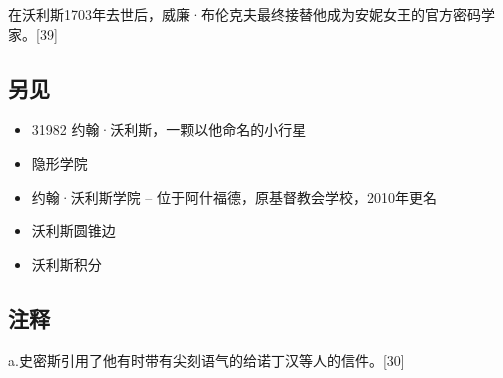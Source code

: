 在沃利斯1703年去世后，威廉·布伦克夫最终接替他成为安妮女王的官方密码学家。[39]
\subsection{另见}
\begin{itemize}
\item 31982 约翰·沃利斯，一颗以他命名的小行星
\item 隐形学院
\item 约翰·沃利斯学院 – 位于阿什福德，原基督教会学校，2010年更名
\item 沃利斯圆锥边
\item 沃利斯积分
\end{itemize}
\subsection{注释}
a.史密斯引用了他有时带有尖刻语气的给诺丁汉等人的信件。[30]
